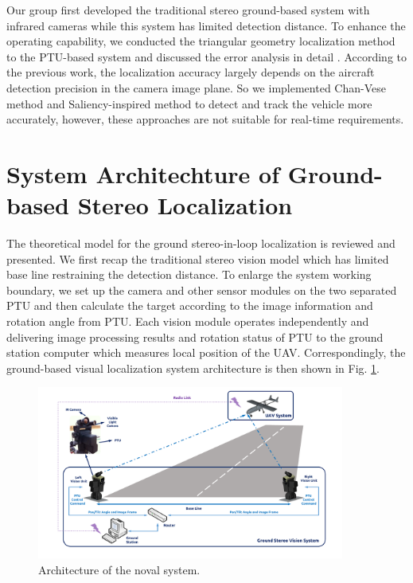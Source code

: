 Our group first developed the traditional stereo ground-based system with infrared cameras \cite{kong2013autonomous} while this system has limited detection distance. To enhance the operating capability, we conducted the triangular geometry localization method to the PTU-based system and discussed the error analysis in detail \cite{kong2014ground}. According to the previous work, the localization accuracy largely depends on the aircraft detection precision in the camera image plane. So we implemented Chan-Vese method \cite{tang2016ground} and Saliency-inspired method \cite{ma2016stereo} to detect and track the vehicle more accurately, however, these approaches are not suitable for real-time requirements.





\section{System Architechture of Ground-based Stereo Localization}
The theoretical model for the ground stereo-in-loop localization is reviewed and presented. We first recap the traditional stereo vision model which has limited base line restraining the detection distance. To enlarge the system working boundary, we set up the camera and other sensor modules on the two separated PTU and then calculate the target according to the image information and rotation angle from PTU. Each vision module operates independently and delivering image processing results and rotation status of PTU to the ground station computer which measures local position of the UAV. Correspondingly, the ground-based visual  localization system architecture is then shown in Fig. \ref{fig:SystemStructure}.


\begin{figure}[!tb]
	\centering
	\includegraphics[width=0.9\textwidth]{Figs/SystemStructure2.pdf}
	\caption{Architecture of the noval system.}
	\label{fig:SystemStructure}
\end{figure}




